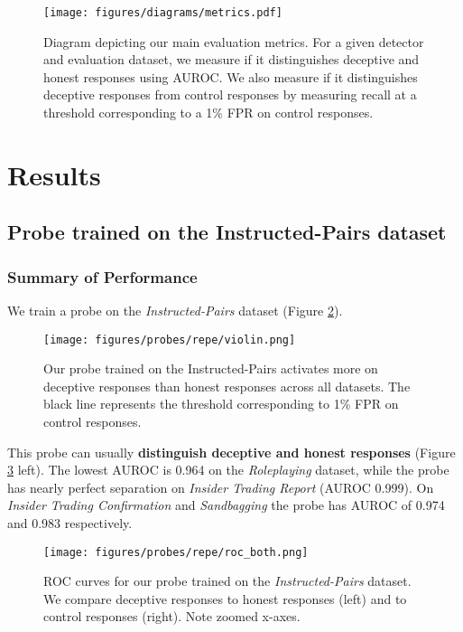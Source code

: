 \documentclass{article}
\begin{document}
\begin{figure}[h]
    \centering
    \texttt{[image: figures/diagrams/metrics.pdf]}

    \caption{Diagram depicting our main evaluation metrics.
    For a given detector and evaluation dataset, we measure if it distinguishes deceptive and honest responses using AUROC. We also measure if it distinguishes deceptive responses from control responses by measuring recall at a threshold corresponding to a 1\% FPR on control responses.}
    \label{fig:metrics}
\end{figure}

\section{Results}\label{results}
\subsection{Probe trained on the Instructed-Pairs
dataset}\label{probe-trained-on-the-instructed-pairs-dataset}

\subsubsection{Summary of Performance}\label{summary-of-performance}
We train a probe on the \textit{Instructed-Pairs} dataset (Figure \ref{fig:repe-violin}).
\begin{figure}[h]
    \centering
    \texttt{[image: figures/probes/repe/violin.png]}
    \caption{Our probe trained on the Instructed-Pairs activates more on deceptive responses than honest responses across all datasets. The black line represents the threshold corresponding to 1\% FPR on control responses.}
    \label{fig:repe-violin}
\end{figure}


This probe can usually \textbf{distinguish deceptive and
honest responses} (Figure \ref{fig:repe-rocs} left). The lowest AUROC is 0.964 on the \textit{Roleplaying} dataset, while the probe has nearly perfect separation on \textit{Insider Trading Report} (AUROC 0.999). On \textit{Insider Trading Confirmation} and \textit{Sandbagging} the probe has AUROC of 0.974 and 0.983 respectively.

\begin{figure}[h]
    \centering
    \texttt{[image: figures/probes/repe/roc\_both.png]}    
    \caption{ROC curves for our probe trained on the \textit{Instructed-Pairs} dataset. We compare deceptive responses to honest responses (left) and to control responses (right). Note zoomed x-axes.}
    \label{fig:repe-rocs}
\end{figure}
\end{document}
